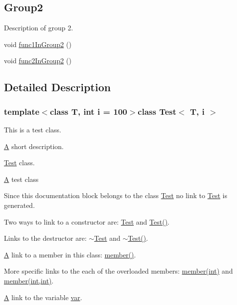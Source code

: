 \subsection*{Group2}
\label{_amgrp6be2faefeff8740e94471f5ae04da6d0}%
Description of group 2. \begin{DoxyCompactItemize}
\item 
void \hyperlink{class_test_a627da802edbda6cebe0849202e3da85e}{func1\-In\-Group2} ()
\item 
void \hyperlink{class_test_ae6d5e6f9e0d9ac70e976be7476499b74}{func2\-In\-Group2} ()
\end{DoxyCompactItemize}


\subsection{Detailed Description}
\subsubsection*{template$<$class T, int i = 100$>$class Test$<$ T, i $>$}

This is a test class. 

\hyperlink{class_a}{A} short description.

\hyperlink{class_test}{Test} class.

\hyperlink{class_a}{A} test class

Since this documentation block belongs to the class \hyperlink{class_test}{Test} no link to \hyperlink{class_test}{Test} is generated.

Two ways to link to a constructor are\-: \hyperlink{class_test}{Test} and \hyperlink{class_test_a44e3a28c552193de099601e2910531f1}{Test()}.

Links to the destructor are\-: \hyperlink{class_test_a31b169208ad4fc5344a7b6b8e1fd00c1}{$\sim$\-Test} and \hyperlink{class_test_a31b169208ad4fc5344a7b6b8e1fd00c1}{$\sim$\-Test()}.

\hyperlink{class_a}{A} link to a member in this class\-: \hyperlink{class_test_a703997077e40c222687a0ea2973a9ea1}{member()}.

More specific links to the each of the overloaded members\-: \hyperlink{class_test_ac2f90eeb597ab8382dcdfcdf1df720f1}{member(int)} and \hyperlink{class_test_aea163a1016f022bdb9e4acc3a32fa3eb}{member(int,int)}.

\hyperlink{class_a}{A} link to the variable \hyperlink{class_test_ae75d55c8cf6390227d51c0965a4de296}{var}.

